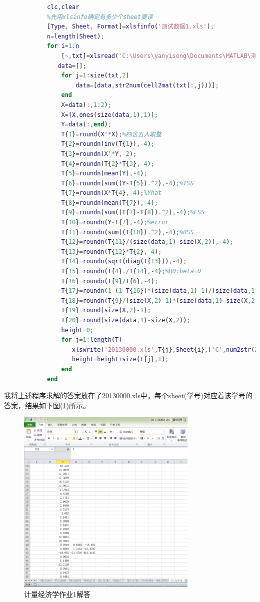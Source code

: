             \begin{lstlisting}[language=Matlab]
            %ans_econom.m程序用于解决计量经济学试题1
            clc,clear
            %先用xlsinfo确定有多少个sheet要读
            [Type, Sheet, Format]=xlsfinfo('测试数据1.xls');
            n=length(Sheet);
            for i=1:n
                [~,txt]=xlsread('C:\Users\yanyisong\Documents\MATLAB\测试数据1.xls',Sheet{i},'B3:D12');
               data=[];
                for j=1:size(txt,2)
                    data=[data,str2num(cell2mat(txt(:,j)))];
                end
                X=data(:,1:2);
                X=[X,ones(size(data,1),1)];
                Y=data(:,end);
                T{1}=round(X'*X);%四舍五入取整
                T{2}=roundn(inv(T{1}),-4);
                T{3}=roundn(X'*Y,-2);
                T{4}=roundn(T{2}*T{3},-4);
                T{5}=roundn(mean(Y),-4);
                T{6}=roundn(sum((Y-T{5}).^2),-4);%TSS
                T{7}=roundn(X*T{4},-4);%Yhat
                T{8}=roundn(mean(T{7}),-4);
                T{9}=roundn(sum((T{7}-T{8}).^2),-4);%ESS
                T{10}=roundn(Y-T{7},-4);%error
                T{11}=roundn(sum((T{10}).^2),-4);%RSS
                T{12}=roundn(T{11}/(size(data,1)-size(X,2)),-4);
                T{13}=roundn(T{12}*T{2},-4);
                T{14}=roundn(sqrt(diag(T{13})),-4);
                T{15}=roundn(T{4}./T{14},-4);%H0:beta=0
                T{16}=roundn(T{9}/T{6},-4);
                T{17}=roundn(1-(1-T{16})*(size(data,1)-1)/(size(data,1)-size(X,2)),-4);
                T{18}=roundn(T{9}/(size(X,2)-1)*(size(data,1)-size(X,2))/T{11},-4);
                T{19}=round(size(X,2)-1);
                T{20}=round(size(data,1)-size(X,2));
                height=0;
                for j=1:length(T)
                   xlswrite('20130000.xls',T{j},Sheet{i},['C',num2str(2+height)])
                   height=height+size(T{j},1);
                end
            end
            \end{lstlisting}
            我将上述程序求解的答案放在了20130000.xls中，每个sheet(学号)对应着该学号的答案，结果如下图(\ref{fig:Link_3})所示。
            \begin{figure}[H]
            \centering
            \includegraphics[height=9cm]{images/Link_3.jpg}
            \caption{计量经济学作业1解答}
            \label{fig:Link_3}
            \end{figure}
